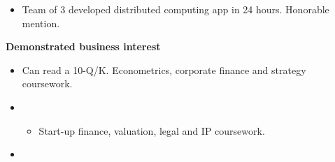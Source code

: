 \documentclass[margin, a4paper]{res}
\begin{document}
\begin{sloppypar}
\begin{resume}
    \begin{itemize}
        \item Team of 3 developed distributed computing app in 24 hours. Honorable mention.
    \end{itemize}



\textbf{Demonstrated business interest}
\begin{itemize}
    \item Can read a 10-Q/K. Econometrics, corporate finance and strategy coursework. 
    \item {}
        \begin{itemize}
                \item Start-up finance, valuation, legal and IP coursework.
        \end{itemize}
    \item {}
\end{itemize}






\end{resume}
\end{sloppypar}
\end{document}
